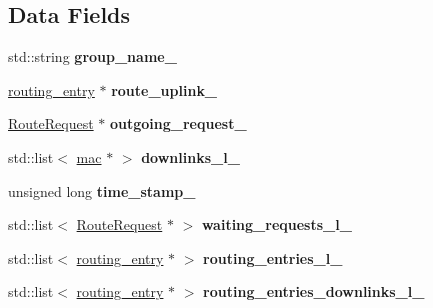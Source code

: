 \subsection*{Data Fields}
\begin{DoxyCompactItemize}
\item 
\hypertarget{classMcTree_a0c1d0f05e3e15a1e2f34da89af60b7b6}{std\-::string {\bfseries group\-\_\-name\-\_\-}}\label{classMcTree_a0c1d0f05e3e15a1e2f34da89af60b7b6}

\item 
\hypertarget{classMcTree_a9981a01e6a0dba10df1410180185f68f}{\hyperlink{structrouting__entry}{routing\-\_\-entry} $\ast$ {\bfseries route\-\_\-uplink\-\_\-}}\label{classMcTree_a9981a01e6a0dba10df1410180185f68f}

\item 
\hypertarget{classMcTree_a30035023d97348916ee6e96bff2dfeec}{\hyperlink{classRouteRequest}{Route\-Request} $\ast$ {\bfseries outgoing\-\_\-request\-\_\-}}\label{classMcTree_a30035023d97348916ee6e96bff2dfeec}

\item 
\hypertarget{classMcTree_a42b5e7daf64fab9087f3583e342da5be}{std\-::list$<$ \hyperlink{structmac}{mac} $\ast$ $>$ {\bfseries downlinks\-\_\-l\-\_\-}}\label{classMcTree_a42b5e7daf64fab9087f3583e342da5be}

\item 
\hypertarget{classMcTree_ad8608e35630eb3039d30c237943f06e1}{unsigned long {\bfseries time\-\_\-stamp\-\_\-}}\label{classMcTree_ad8608e35630eb3039d30c237943f06e1}

\item 
\hypertarget{classMcTree_a429e63decbf8d5392120645a4a32a407}{std\-::list$<$ \hyperlink{classRouteRequest}{Route\-Request} $\ast$ $>$ {\bfseries waiting\-\_\-requests\-\_\-l\-\_\-}}\label{classMcTree_a429e63decbf8d5392120645a4a32a407}

\item 
\hypertarget{classMcTree_ae15d457bf08d64befaaaefd70eac31fb}{std\-::list$<$ \hyperlink{structrouting__entry}{routing\-\_\-entry} $\ast$ $>$ {\bfseries routing\-\_\-entries\-\_\-l\-\_\-}}\label{classMcTree_ae15d457bf08d64befaaaefd70eac31fb}

\item 
\hypertarget{classMcTree_a525e7fa1646f961a5f07f22e9316e537}{std\-::list$<$ \hyperlink{structrouting__entry}{routing\-\_\-entry} $\ast$ $>$ {\bfseries routing\-\_\-entries\-\_\-downlinks\-\_\-l\-\_\-}}\label{classMcTree_a525e7fa1646f961a5f07f22e9316e537}


\end{DoxyCompactItemize}
